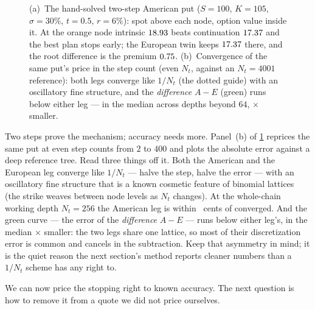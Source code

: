 \begin{figure}[htbp]
\centering
{}
\caption{(a)~The hand-solved two-step American put ($S=100$, $K=105$,
$\sigma=30\%$, $t=0.5$, $r=6\%$): spot above each node, option value
inside it.  At the orange node intrinsic $18.93$ beats
continuation $17.37$ and the best plan stops early;
the European twin keeps $17.37$ there, and the root
difference is the premium $0.75$.  (b)~Convergence
of the same put's price in the step count (even $N_t$, against an
$N_t=4001$ reference): both legs converge like $1/N_t$ (the dotted
guide) with an oscillatory fine structure, and the \emph{difference}
$A-E$ (green) runs below either leg --- in the median across depths
beyond $64$, \MacDeamConvRatio$\times$ smaller.}
\label{fig:deamtree}
\end{figure}

Two steps prove the mechanism; accuracy needs more.  Panel~(b) of
\cref{fig:deamtree} reprices the same put at even step counts from $2$
to $400$ and plots the absolute error against a deep reference tree.
Read three things off it.  Both the American and the European leg
converge like $1/N_t$ --- halve the step, halve the error --- with an
oscillatory fine structure that is a known cosmetic feature of
binomial lattices (the strike weaves between node levels as $N_t$
changes).  At the whole-chain working depth $N_t=256$ the American
leg is within \MacDeamConvAmErrCents\ cents of converged.  And the green
curve --- the error of the \emph{difference} $A-E$ --- runs below
either leg's, in the median \MacDeamConvRatio$\times$ smaller: the
two legs share one lattice, so most of their discretization error is
common and cancels in the subtraction.  Keep that asymmetry in mind;
it is the quiet reason the next section's method reports cleaner
numbers than a $1/N_t$ scheme has any right to.

We can now price the stopping right to known accuracy.  The next
question is how to remove it from a quote we did not price ourselves.

